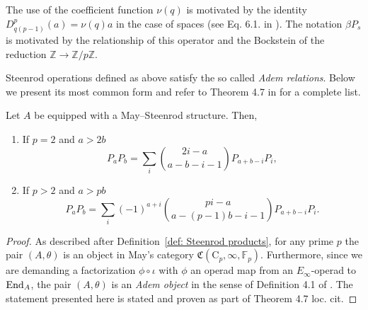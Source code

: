 \begin{remark}
	The use of the coefficient function $\nu(q)$ is motivated by the identity $D_{q(p-1)}^p(a) = \nu(q)a$ in the case of spaces (see Eq. 6.1. in \cite{steenrod1953cyclic}).
	The notation $\beta P_s$ is motivated by the relationship of this operator and the Bockstein of the reduction $\mathbb Z \to \mathbb Z/p\mathbb Z$.
\end{remark}

Steenrod operations defined as above satisfy the so called \textit{Adem relations}.
Below we present its most common form and refer to Theorem 4.7 in \cite{may1970general} for a complete list.

\begin{lemma}
	Let $A$ be equipped with a May--Steenrod structure.
	Then,
	\begin{enumerate}
		\item If $p = 2$ and $a > 2b$
		\begin{equation*}
		P_{a} P_{b} = \sum_i \binom{2i-a}{a-b-i-1} P_{a+b-i}P_i,
		\end{equation*}
		\item If $p > 2$ and $a > pb$
		\begin{equation*}
		P_{a} P_{b} = \sum_i (-1)^{a+i} \binom{pi-a}{a-(p-1)b-i-1} P_{a+b-i}P_i.
		\end{equation*}
	\end{enumerate}
\end{lemma}

\begin{proof}
	As described after Definition~\ref{def: Steenrod products}, for any prime $p$ the pair $(A, \theta)$ is an object in May's category $\mathfrak{C}(\mathrm C_p, \infty, \mathbb{F}_p)$.
	Furthermore, since we are demanding a factorization $\phi \circ \iota$ with $\phi$ an operad map from an $E_\infty$-operad to $\mathrm{End}_A$, the pair $(A, \theta)$ is an \textit{Adem object} in the sense of Definition 4.1 of \cite{may1970general}.
	The statement presented here is stated and proven as part of Theorem 4.7 loc. cit.
\end{proof}

